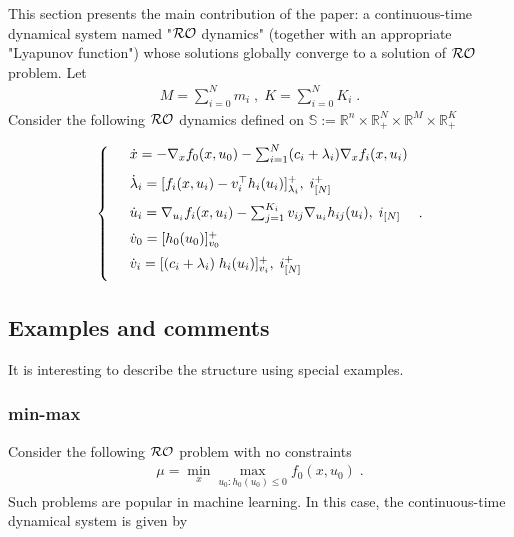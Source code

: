 \documentclass[journal,twoside,web]{ieeecolor}
\begin{document}
This section presents the main contribution of the paper: a continuous-time dynamical system named "${\cal RO}$ dynamics" (together with an appropriate "Lyapunov function") whose solutions globally converge to a solution of ${\cal RO}$ problem. Let
\begin{align*}
M=\sum_{i=0}^{N}m_i\;,\; K=\sum_{i=0}^{N}K_i\;.
\end{align*}
Consider the following ${\cal RO}$ dynamics defined on $\mathbb{S}:= \mathbb{R}^n \times \mathbb{R}^N_{+} \times \mathbb{R}^M \times \mathbb{R}^K_+$\;

\begin{align} \label{pd_dynamics}
\left\{
\begin{array}{cl}
\vspace{3mm}
&\dot x=-\nabla_x f_0(x,u_0)-  \sum_{i=1}^N(c_i+\lambda_i) \nabla_x f_i(x,u_i)\\
\vspace{2mm}
&\dot \lambda_i=[f_i(x,u_i)-v_i^\top h_i(u_i)]_{\lambda_i}^+,\; i^+_{[N]}\\
\vspace{2mm}
&\dot u_i=\nabla_{u_i}f_i(x,u_i)-  \sum_{j=1}^{K_i} v_{ij} \nabla_{u_i} h_{ij}(u_i),\; i_{[N]}\\
\vspace{2mm}
&\dot{v}_0=[h_0(u_0)]_{v_0}^+\\
\vspace{2mm}
&\dot v_i=[(c_i+\lambda_i) \; h_i(u_i)]_{v_i}^+,\;i^+_{[N]}
\end{array}\right..
\end{align}

\subsection{Examples and comments} \label{examples_and_comments}
It is interesting to describe the structure using special examples.

\subsubsection{min-max} Consider the following ${\cal RO}$ problem with no constraints
\begin{align*}
\mu=\min_x\max_{u_0:h_0(u_0)\leq 0}f_0(x,u_0)\;.
\end{align*}
Such problems are popular in machine learning. In this case, the continuous-time dynamical system is given by 
\end{document}
